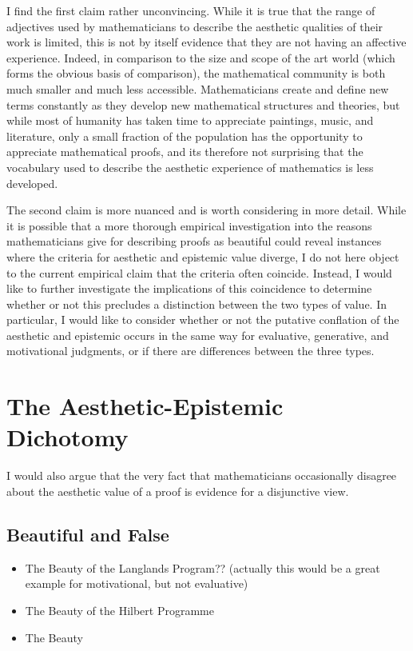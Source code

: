 \documentclass[a4paper,man,natbib]{apa6}
\begin{document}
I find the first claim rather unconvincing. While it is true that the range of adjectives used by mathematicians to describe
the aesthetic qualities of their work is limited, this is not by itself evidence that they are not having an affective
experience. Indeed, in comparison to the size and scope of the art world (which forms the obvious basis of comparison),
the mathematical community is both much smaller and much less accessible. Mathematicians create and define new terms
constantly as they develop new mathematical structures and theories, but while most of humanity has taken time to 
appreciate paintings, music, and literature, only a small fraction of the population has the opportunity to appreciate
mathematical proofs, and its therefore not surprising that the vocabulary used to describe the aesthetic experience
of mathematics is less developed.

The second claim is more nuanced and is worth considering in more detail. While it is possible that a more thorough 
empirical investigation into the reasons mathematicians give for describing proofs as beautiful could reveal instances
where the criteria for aesthetic and epistemic value diverge, I do not here object to the current empirical claim 
that the criteria often coincide. Instead, I would like to further investigate the implications of this coincidence
to determine whether or not this precludes a distinction between the two types of value. In particular, I
would like to consider whether or not the putative conflation of the aesthetic and epistemic occurs in the same
way for evaluative, generative, and motivational judgments, or if there are differences between the three types.


\section{The Aesthetic-Epistemic Dichotomy}

I would also argue that the very fact that mathematicians occasionally disagree about the aesthetic value of a proof
is evidence for a disjunctive view.

\subsection{Beautiful and False}

\begin{itemize}
      \item The Beauty of the Langlands Program?? (actually this would be a great example for motivational, but not
            evaluative)
      \item The Beauty of the Hilbert Programme
      \item The Beauty 
\end{itemize}
\end{document}
